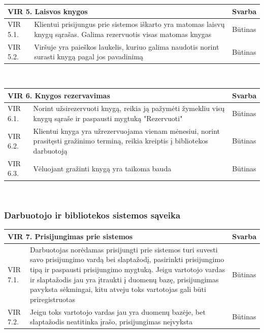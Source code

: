 \documentclass{VUMIFPSkursinis}
\begin{document}
    \noindent
	\vspace{5mm}
    \begin{tabular}{ | p{} | p{} | p{} |}
    		\hline
   				\multicolumn{2}{|l|}{ VIR 5. Laisvos knygos} &Svarba  \\ \hline 
		  	VIR 5.1. & Klientui prisijungus prie sistemos iškarto yra matomas laisvų knygų sąrašas. Galima rezervuotis visas matomas knygas & Būtinas \\ \hline
            VIR 5.2. & Viršuje yra paieškos laukelis, kuriuo galima naudotis norint surasti knygą pagal jos pavadinimą & Būtinas \\ \hline
   	\end{tabular}\\
    
    \noindent
	\vspace{5mm}
    \begin{tabular}{ | p{} | p{} | p{} |}
    		\hline
   				\multicolumn{2}{|l|}{ VIR 6. Knygos rezervavimas} &Svarba  \\ \hline 
		  	VIR 6.1. & Norint užsirezervuoti knygą, reikia ją pažymėti žymekliu visų knygų sąraše ir paspausti mygtuką "Rezervuoti" & Būtinas \\ \hline
            VIR 6.2. & Klientui knyga yra užrezervuojama vienam mėnesiui, norint prasitęsti gražinimo terminą, reikia kreiptis į bibliotekos darbuotoją & Būtinas \\ \hline
            VIR 6.3. & Vėluojant gražinti knygą yra taikoma bauda & Būtinas \\ \hline
   	\end{tabular}\\
    
    \subsubsection{Darbuotojo ir bibliotekos sistemos sąveika }

	\noindent
\vspace{5mm}
    \begin{tabular}{ | p{} | p{} | p{} |}
    		\hline
   			\multicolumn{2}{|l|}{ VIR 7. Prisijungimas prie sistemos} &Svarba  \\ \hline 
		  	VIR 7.1. & Darbuotojas norėdamas prisijungti prie sistemos turi suvesti savo prisijungimo vardą bei slaptažodį, pasirinkti prisijungimo tipą ir paspausti prisijungimo mygtuką. Jeigu vartotojo vardas ir slaptažodis jau yra įtraukti į duomenų bazę, prisijungimas pavyksta sėkmingai, kitu atveju toks vartotojas gali būti priregistruotas & Būtinas \\ \hline
            VIR 7.2. & Jeigu toks vartotojo vardas jau yra duomenų bazėje, bet slaptažodis neatitinka įrašo, prisijungimas neįvyksta & Būtinas \\ \hline
   	\end{tabular}\\
    
\end{document}
